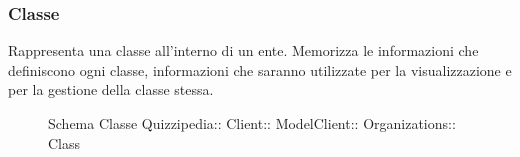 \subsubsection{Classe }
Rappresenta una classe all'interno di un ente. Memorizza le informazioni che definiscono ogni classe,
informazioni che saranno utilizzate per la visualizzazione e per la gestione della classe stessa.
\begin{figure}[H]
\centering
\noindent{}
\caption[Schema Classe Class]{Schema Classe Quizzipedia:: Client:: ModelClient:: Organizations:: Class}
\end{figure}

